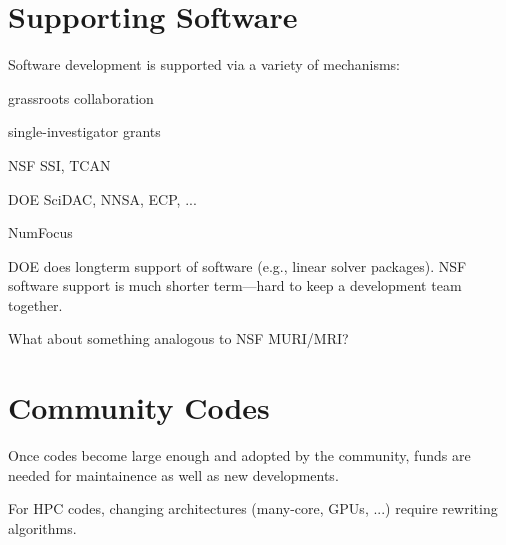 \documentclass[11pt]{article}
\begin{document}
\section{Supporting Software}

Software development is supported via a variety of mechanisms:

grassroots collaboration

single-investigator grants

NSF SSI, TCAN

DOE SciDAC, NNSA, ECP, ...

NumFocus

DOE does longterm support of software (e.g., linear solver packages).
NSF software support is much shorter term---hard to keep a development
team together.

What about something analogous to NSF MURI/MRI?


\section{Community Codes}

Once codes become large enough and adopted by the community, funds are
needed for maintainence as well as new developments.

For HPC codes, changing architectures (many-core, GPUs, ...) require rewriting
algorithms.
\end{document}
